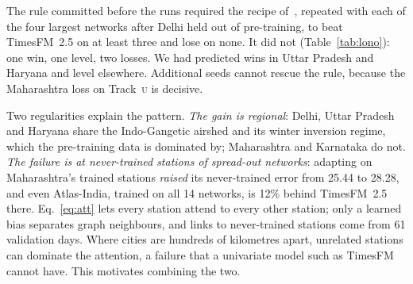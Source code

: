 \documentclass{article}
\newcommand{\pmu}{\ensuremath{\mu\mathrm{g/m^3}}}
\newcommand{\trk}[1]{\textsc{#1}}
\begin{document}
\begin{table}[t]
\caption{\textbf{Leave one network out} (pre-registered). Atlas pre-trained on the other 13 networks, adapted on the
target's history, scored on its all-India test windows. MAE \trk{s}\,/\,\trk{u} in \pmu; verdict against TimesFM~2.5
with relative MAE difference and Diebold--Mariano $p$ per track.}
\label{tab:lono}
\centering\small
\setlength{\tabcolsep}{3.5pt}
\end{table}

The rule committed before the runs required the recipe of~\citep{atlas1}, repeated with each of the four largest
networks after Delhi held out of pre-training, to beat TimesFM~2.5 on at least three and lose on none. It did not
(Table~\ref{tab:lono}): one win, one level, two losses. We had predicted wins in Uttar Pradesh and Haryana and level
elsewhere. Additional seeds cannot rescue the rule, because the Maharashtra loss on Track~\trk{u} is decisive.

Two regularities explain the pattern. \emph{The gain is regional}: Delhi, Uttar Pradesh and Haryana share the
Indo-Gangetic airshed and its winter inversion regime, which the pre-training data is dominated by; Maharashtra and
Karnataka do not. \emph{The failure is at never-trained stations of spread-out networks}: adapting on Maharashtra's
trained stations \emph{raised} its never-trained error from 25.44 to 28.28, and even Atlas-India, trained on all 14
networks, is 12\% behind TimesFM~2.5 there. Eq.~\eqref{eq:att} lets every station attend to every other station; only a
learned bias separates graph neighbours, and links to never-trained stations come from 61 validation days. Where cities
are hundreds of kilometres apart, unrelated stations can dominate the attention, a failure that a univariate model such
as TimesFM cannot have. This motivates combining the two.
\end{document}

